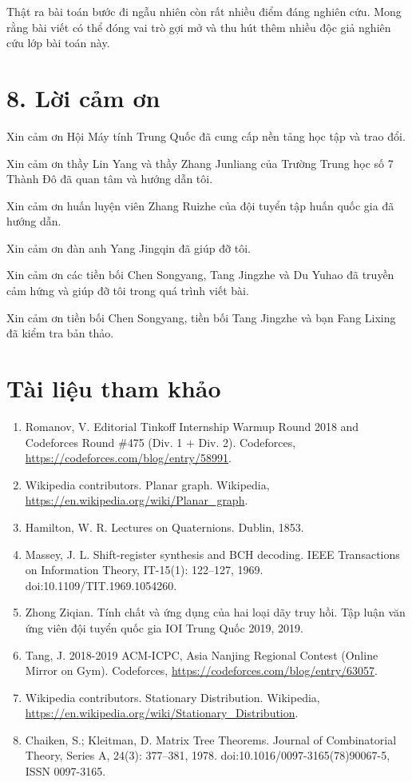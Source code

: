 \documentclass[11pt]{article}
\begin{document}
Thật ra bài toán bước đi ngẫu nhiên còn rất nhiều điểm đáng nghiên cứu. Mong
rằng bài viết có thể đóng vai trò gợi mở và thu hút thêm nhiều độc giả nghiên
cứu lớp bài toán này.

\section*{8. Lời cảm ơn}

Xin cảm ơn Hội Máy tính Trung Quốc đã cung cấp nền tảng học tập và trao đổi.

Xin cảm ơn thầy Lin Yang và thầy Zhang Junliang của Trường Trung học số 7
Thành Đô đã quan tâm và hướng dẫn tôi.

Xin cảm ơn huấn luyện viên Zhang Ruizhe của đội tuyển tập huấn quốc gia đã
hướng dẫn.

Xin cảm ơn đàn anh Yang Jingqin đã giúp đỡ tôi.

Xin cảm ơn các tiền bối Chen Songyang, Tang Jingzhe và Du Yuhao đã truyền cảm
hứng và giúp đỡ tôi trong quá trình viết bài.

Xin cảm ơn tiền bối Chen Songyang, tiền bối Tang Jingzhe và bạn Fang Lixing đã
kiểm tra bản thảo.

\section*{Tài liệu tham khảo}

\begin{enumerate}
  \item Romanov, V. Editorial Tinkoff Internship Warmup Round 2018 and
        Codeforces Round \#475 (Div. 1 + Div. 2). Codeforces,
        \url{https://codeforces.com/blog/entry/58991}.
  \item Wikipedia contributors. Planar graph. Wikipedia,
        \url{https://en.wikipedia.org/wiki/Planar_graph}.
  \item Hamilton, W. R. Lectures on Quaternions. Dublin, 1853.
  \item Massey, J. L. Shift-register synthesis and BCH decoding. IEEE
        Transactions on Information Theory, IT-15(1): 122--127, 1969.
        doi:10.1109/TIT.1969.1054260.
  \item Zhong Ziqian. Tính chất và ứng dụng của hai loại dãy truy hồi. Tập
        luận văn ứng viên đội tuyển quốc gia IOI Trung Quốc 2019, 2019.
  \item Tang, J. 2018-2019 ACM-ICPC, Asia Nanjing Regional Contest (Online
        Mirror on Gym). Codeforces, \url{https://codeforces.com/blog/entry/63057}.
  \item Wikipedia contributors. Stationary Distribution. Wikipedia,
        \url{https://en.wikipedia.org/wiki/Stationary_Distribution}.
  \item Chaiken, S.; Kleitman, D. Matrix Tree Theorems. Journal of
        Combinatorial Theory, Series A, 24(3): 377--381, 1978.
        doi:10.1016/0097-3165(78)90067-5, ISSN 0097-3165.
\end{enumerate}
\end{document}
